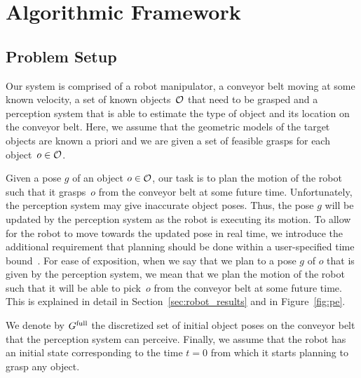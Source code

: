 \documentclass[a4paper]{report}
\begin{document}
\section{Algorithmic Framework}
\subsection{Problem Setup}
Our system is comprised of 
a robot manipulator,
a conveyor belt moving at some known velocity,
a set of known objects~$\mathcal{O}$ that need to be grasped and 
a perception system that is able to estimate the type of object and its location on the conveyor belt. Here, we assume that the geometric models of the target objects are known a priori and we are given a set of feasible grasps for each object~$o \in \mathcal{O}$.

Given a pose $g$ of an object $o \in \mathcal{O}$, our task is to plan the motion of the robot such that it grasps~$o$ from the conveyor belt at some future time.
%
Unfortunately, the perception system may give inaccurate object poses.
Thus, the pose $g$ will be updated by the perception system as the robot is executing its motion. 
To allow for the robot to move towards the updated pose in real time, we introduce the additional requirement that planning should be done within a user-specified time bound~\Tbound.
%
For ease of exposition, when we say that we plan to a pose $g$ of $o$ that is given by the perception system, 
we mean that we plan the motion of the robot such that it will be able to pick~$o$ from the conveyor belt at some future time. 
This is explained in detail in Section~\ref{sec:robot_results} and in Figure~\ref{fig:pe}.

%
We denote by $G^{\textrm{full}}$ the discretized set of initial object poses on the conveyor belt that the perception system can perceive.
%
Finally, we assume that the robot has an initial state \Shome corresponding to the time $t=0$ from which it starts planning to grasp any object.
\end{document}

